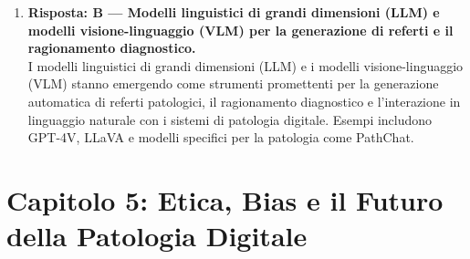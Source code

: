 \begin{enumerate}
    \item \textbf{Risposta: B --- Modelli linguistici di grandi dimensioni (LLM) e modelli
    visione-linguaggio (VLM) per la generazione di referti e il ragionamento diagnostico.}\\
    I modelli linguistici di grandi dimensioni (LLM) e i modelli visione-linguaggio (VLM) stanno
    emergendo come strumenti promettenti per la generazione automatica di referti patologici, il
    ragionamento diagnostico e l'interazione in linguaggio naturale con i sistemi di patologia
    digitale. Esempi includono GPT-4V, LLaVA e modelli specifici per la patologia come PathChat.

\end{enumerate}

\section*{Capitolo 5: Etica, Bias e il Futuro della Patologia Digitale}

